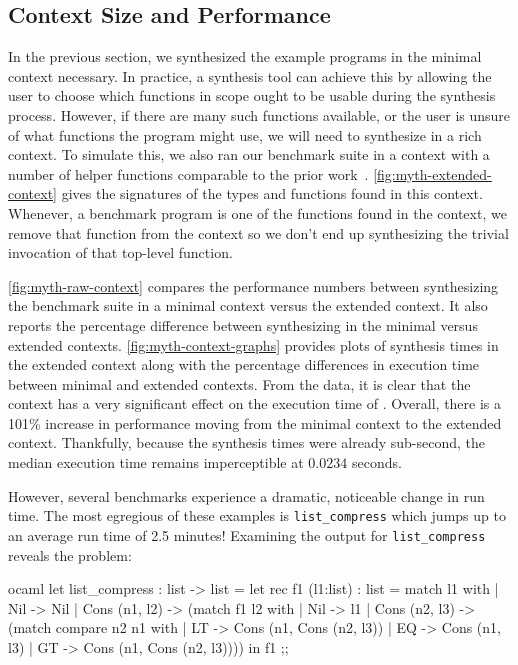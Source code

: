\subsection{Context Size and Performance}
\label{subsec:context-size-and-performance}



In the previous section, we synthesized the example programs in the minimal context necessary.
In practice, a synthesis tool can achieve this by allowing the user to choose which functions in scope ought to be usable during the synthesis process.
However, if there are many such functions available, or the user is unsure of what functions the program might use, we will need to synthesize in a rich context.
To simulate this, we also ran our benchmark suite in a context with a number of helper functions comparable to the prior work~\citep{albarghouthi-cav-2013, kuncak-pldi-2010}.
\autoref{fig:myth-extended-context} gives the signatures of the types and functions found in this context.
Whenever, a benchmark program is one of the functions found in the context, we remove that function from the context so we don't end up synthesizing the trivial invocation of that top-level function.




\autoref{fig:myth-raw-context} compares the performance numbers between synthesizing the benchmark suite in a minimal context versus the extended context.
It also reports the percentage difference between synthesizing in the minimal versus extended contexts.
\autoref{fig:myth-context-graphs} provides plots of synthesis times in the extended context along with the percentage differences in execution time between minimal and extended contexts.
From the data, it is clear that the context has a very significant effect on the execution time of \myth{}.
Overall, there is a 101\% increase in performance moving from the minimal context to the extended context.
Thankfully, because the synthesis times were already sub-second, the median execution time remains imperceptible at $0.0234$ seconds.

However, several benchmarks experience a dramatic, noticeable change in run time.
The most egregious of these examples is \texttt{list\_compress} which jumps up to an average run time of 2.5 minutes!
Examining the output for \texttt{list\_compress} reveals the problem:

\begin{center}
  \begin{cminted}{ocaml}
let list_compress : list -> list =
  let rec f1 (l1:list) : list =
    match l1 with
    | Nil -> Nil
    | Cons (n1, l2) ->
      (match f1 l2 with
      | Nil -> l1
      | Cons (n2, l3) ->
        (match compare n2 n1 with
        | LT -> Cons (n1, Cons (n2, l3))
        | EQ -> Cons (n1, l3)
        | GT -> Cons (n1, Cons (n2, l3))))
in
  f1
;;
  \end{cminted}
\end{center}

